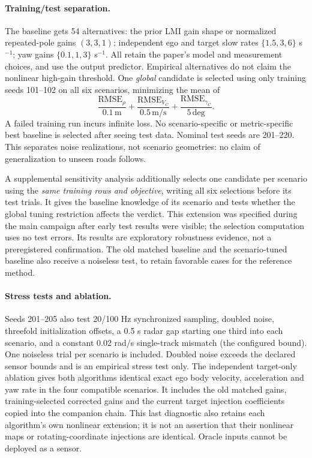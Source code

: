 \documentclass[11pt]{article}
\begin{document}
\paragraph{Training/test separation.}
The baseline gets 54 alternatives: the prior LMI gain shape or normalized
repeated-pole gains $(3,3,1)$; independent ego and target slow rates
$\{1.5,3,6\}$ s$^{-1}$; yaw gains $\{0.1,1,3\}$ s$^{-1}$.
All retain the paper's model and measurement choices, and use the output
predictor. Empirical alternatives do not claim the nonlinear high-gain
threshold. One \emph{global} candidate is selected using only training
seeds 101--102 on all six scenarios, minimizing the mean of
\[
 \frac{\mathrm{RMSE}_{\rho}}{0.1\,\mathrm m}
 +\frac{\mathrm{RMSE}_{V_C}}{0.5\,\mathrm{m/s}}
 +\frac{\mathrm{RMSE}_{\gamma_C}}{5\,\mathrm{deg}}.
\]
A failed training run incurs infinite loss. No scenario-specific or
metric-specific best baseline is selected after seeing test data. Nominal
test seeds are 201--220. This separates noise realizations, not scenario
geometries: no claim of generalization to unseen roads follows.

A supplemental sensitivity analysis additionally selects one candidate per
scenario using the \emph{same training rows and objective}, writing all six
selections before its test trials. It gives the baseline knowledge of its
scenario and tests whether the global tuning restriction affects the verdict.
This extension was specified during the main campaign after early test
results were visible; the selection computation uses no test errors. Its
results are exploratory robustness evidence, not a preregistered confirmation.
The old matched baseline and the scenario-tuned baseline also receive a
noiseless test, to retain favorable cases for the reference method.

\paragraph{Stress tests and ablation.}
Seeds 201--205 also test 20/100 Hz synchronized sampling, doubled noise,
threefold initialization offsets, a 0.5 s radar gap starting one third into
each scenario, and a constant 0.02 rad/s single-track mismatch (the configured
bound). One noiseless trial per scenario is included. Doubled noise exceeds
the declared sensor bounds and is an empirical stress test only.
The independent target-only ablation gives both algorithms identical exact
ego body velocity, acceleration and yaw rate in the four compatible scenarios.
It includes the old matched gains, training-selected corrected gains and
the current target injection coefficients copied into the companion chain.
This last diagnostic also retains each algorithm's own nonlinear extension;
it is not an assertion that their nonlinear maps or rotating-coordinate
injections are identical. Oracle inputs cannot be deployed as a sensor.
\end{document}
